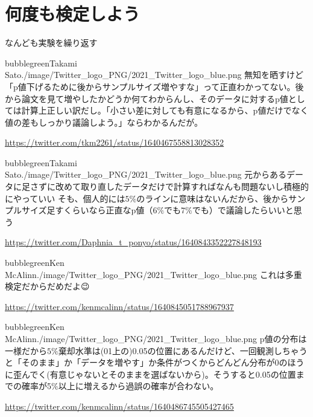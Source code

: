 \section{何度も検定しよう}


\begin{SMbox}{なんども実験を繰り返す}
\begin{rightbubbles}{bubblegreen}{Takami Sato}{./image/Twitter_logo_PNG/2021_Twitter_logo_blue.png}
    無知を晒すけど「p値下げるために後からサンプルサイズ増やすな」って正直わかってない。後から論文を見て増やしたかどうか何てわからんし、そのデータに対するp値としては計算上正しい訳だし。「小さい差に対しても有意になるから、p値だけでなく値の差もしっかり議論しよう。」ならわかるんだが。
    \begin{flushright} 
        \small	\url{https://twitter.com/tkm2261/status/1640467558813028352}
        \end{flushright}  
\end{rightbubbles}

\begin{rightbubbles}{bubblegreen}{Takami Sato}{./image/Twitter_logo_PNG/2021_Twitter_logo_blue.png}
    元からあるデータに足さずに改めて取り直したデータだけで計算すればなんも問題ないし積極的にやっていい
    そも、個人的には$5\%$のラインに意味はないんだから、後からサンプルサイズ足すくらいなら正直なp値（$6\%$でも$7\%$でも）で議論したらいいと思う
    \begin{flushright} 
        \small	\url{https://twitter.com/Daphnia_t_ponyo/status/1640843352227848193}
        \end{flushright}  
\end{rightbubbles}

\begin{rightbubbles}{bubblegreen}{Ken McAlinn}{./image/Twitter_logo_PNG/2021_Twitter_logo_blue.png}
    これは多重検定だからだめだよ😉
\begin{flushright} 
\small	\url{https://twitter.com/kenmcalinn/status/1640845051788967937}
\end{flushright}    
\end{rightbubbles}


\begin{rightbubbles}{bubblegreen}{Ken McAlinn}{./image/Twitter_logo_PNG/2021_Twitter_logo_blue.png}
  p値の分布は一様だから$5\%$棄却水準は(01上の)0.05の位置にあるんだけど、一回観測しちゃうと「そのまま」か「データを増やす」か条件がつくからどんどん分布が0のほうに歪んでく(有意じゃないとそのままを選ばないから)。そうすると0.05の位置までの確率が5$\%$以上に増えるから過誤の確率が合わない。
\begin{flushright} 
\small	\url{https://twitter.com/kenmcalinn/status/1640486745505427465}
\end{flushright}    
\end{rightbubbles}



\end{SMbox}
